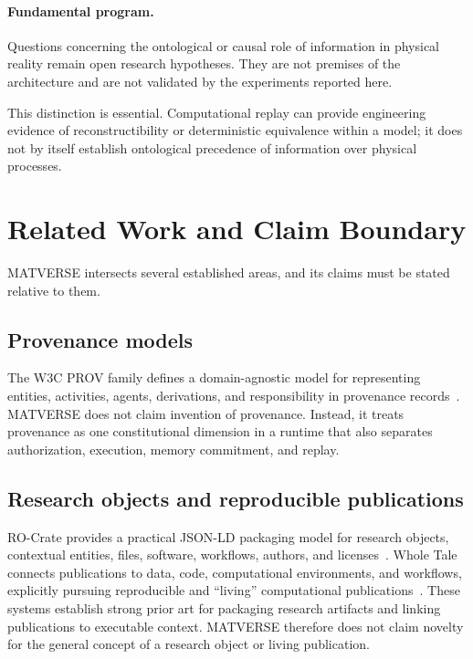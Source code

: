 \documentclass[11pt]{article}
\begin{document}
\paragraph{Fundamental program.} Questions concerning the ontological or causal role of information in physical reality remain open research hypotheses. They are not premises of the architecture and are not validated by the experiments reported here.

This distinction is essential. Computational replay can provide engineering evidence of reconstructibility or deterministic equivalence within a model; it does not by itself establish ontological precedence of information over physical processes.

\section{Related Work and Claim Boundary}

MATVERSE intersects several established areas, and its claims must be stated relative to them.

\subsection{Provenance models}

The W3C PROV family defines a domain-agnostic model for representing entities, activities, agents, derivations, and responsibility in provenance records~\cite{w3cprov}. MATVERSE does not claim invention of provenance. Instead, it treats provenance as one constitutional dimension in a runtime that also separates authorization, execution, memory commitment, and replay.

\subsection{Research objects and reproducible publications}

RO-Crate provides a practical JSON-LD packaging model for research objects, contextual entities, files, software, workflows, authors, and licenses~\cite{rocrate}. Whole Tale connects publications to data, code, computational environments, and workflows, explicitly pursuing reproducible and ``living'' computational publications~\cite{wholetale}. These systems establish strong prior art for packaging research artifacts and linking publications to executable context. MATVERSE therefore does not claim novelty for the general concept of a research object or living publication.
\end{document}

